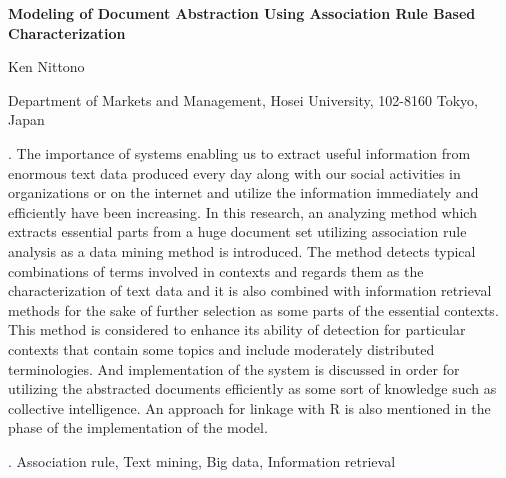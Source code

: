 \documentclass[12pt]{article}
\begin{document}
\begin{flushleft}


{\LARGE\bf 
Modeling of Document Abstraction Using Association Rule Based Characterization
}


\vspace{1.0cm}

Ken Nittono

\begin{description}

\item Department of Markets and Management, Hosei University, 102-8160 Tokyo, Japan

\end{description}

\end{flushleft}


\vspace{0.75cm}

. The importance of systems enabling us to extract useful information from enormous text data produced every day along with our social activities in organizations or on the internet and utilize the information immediately and efficiently have been increasing.
In this research, an analyzing method which extracts essential parts from a huge document set utilizing association rule analysis as a data mining method is introduced.
The method detects typical combinations of terms involved in contexts and regards them as the characterization of text data and it is also combined with information retrieval methods for the sake of further selection as some parts of the essential contexts.
This method is considered to enhance its ability of detection for particular contexts that contain some topics and include moderately distributed terminologies.
And implementation of the system is discussed in order for utilizing the abstracted documents efficiently as some sort of knowledge such as collective intelligence.
An approach for linkage with R is also mentioned in the phase of the implementation of the model.



\vskip 2mm

.
Association rule, Text mining, Big data, Information retrieval
\end{document}
